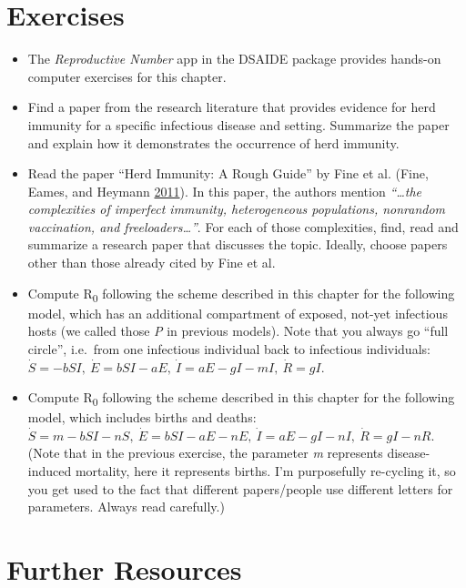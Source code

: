 \documentclass[]{book}
\providecommand{\tightlist}{%
  \setlength{\itemsep}{0pt}\setlength{\parskip}{0pt}}
\theoremstyle{definition}
\theoremstyle{definition}
\theoremstyle{definition}
\theoremstyle{remark}
\begin{document}
\hypertarget{exercises}{%
\section{Exercises}\label{exercises}}

\begin{itemize}
\tightlist
\item
  The \emph{Reproductive Number} app in the DSAIDE package provides
  hands-on computer exercises for this chapter.
\item
  Find a paper from the research literature that provides evidence for
  herd immunity for a specific infectious disease and setting. Summarize
  the paper and explain how it demonstrates the occurrence of herd
  immunity.
\item
  Read the paper ``Herd Immunity: A Rough Guide'' by Fine et al. (Fine,
  Eames, and Heymann \protect\hyperlink{ref-fine11}{2011}). In this
  paper, the authors mention \emph{``\ldots{}the complexities of
  imperfect immunity, heterogeneous populations, nonrandom vaccination,
  and freeloaders\ldots{}''}. For each of those complexities, find, read
  and summarize a research paper that discusses the topic. Ideally,
  choose papers other than those already cited by Fine et al.
\item
  Compute R\textsubscript{0} following the scheme described in this
  chapter for the following model, which has an additional compartment
  of exposed, not-yet infectious hosts (we called those \emph{P} in
  previous models). Note that you always go ``full circle'', i.e.~from
  one infectious individual back to infectious individuals:
  \(\dot S = -b SI, \ \dot E = b S I - a E, \ \dot I = a E - g I - m I, \ \dot R = g I\).
\item
  Compute R\textsubscript{0} following the scheme described in this
  chapter for the following model, which includes births and deaths:
  \(\dot S =m - b SI - n S, \ \dot E = b S I - a E - n E, \ \dot I = a E - g I - n I, \ \dot R = g I - n R\).
  (Note that in the previous exercise, the parameter \emph{m} represents
  disease-induced mortality, here it represents births. I'm purposefully
  re-cycling it, so you get used to the fact that different
  papers/people use different letters for parameters. Always read
  carefully.)
\end{itemize}

\hypertarget{further-resources-1}{%
\section{Further Resources}\label{further-resources-1}}
\end{document}
